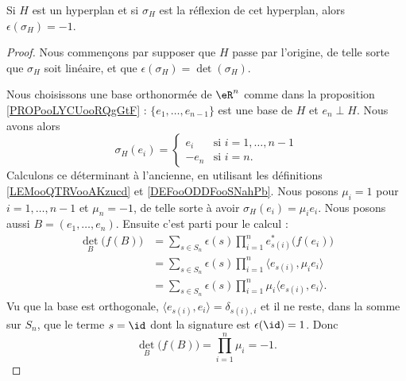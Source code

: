 \begin{lemma}    \label{LEMooJABDooOKHwWv}
	Si \( H\) est un hyperplan et si \( \sigma_{H}\) est la réflexion de cet hyperplan, alors \( \epsilon(\sigma_H)=-1\).
\end{lemma}

\begin{proof}
	Nous commençons par supposer que \( H\) passe par l'origine, de telle sorte que \( \sigma_H\) soit linéaire, et que \( \epsilon(\sigma_H)=\det(\sigma_H)\).

	Nous choisissons une base orthonormée de \( \eR^n\) comme dans la proposition \ref{PROPooLYCUooRQgGtF} : \( \{ e_1,\ldots, e_{n-1} \}\) est une base de \( H\) et \( e_n\perp H\). Nous avons alors
	\begin{equation}
		\sigma_H(e_i)=\begin{cases}
			e_i    & \text{si } i=1,\ldots, n-1 \\
			-e_{n} & \text{si } i=n.
		\end{cases}
	\end{equation}
	Calculons ce déterminant à l'ancienne, en utilisant les définitions \ref{LEMooQTRVooAKzucd} et \ref{DEFooODDFooSNahPb}. Nous posons \( \mu_i=1\) pour \( i=1,\ldots, n-1\) et \( \mu_n=-1\), de telle sorte à avoir \( \sigma_H(e_i)=\mu_ie_i\). Nous posons aussi \( B=(e_1,\ldots, e_n)\). Ensuite c'est parti pour le calcul :
	\begin{subequations}
		\begin{align}
			\det_B\big( f(B) \big) & =\sum_{s\in S_n}\epsilon(s)\prod_{i=1}^ne^*_{s(i)}\big( f(e_i) \big)       \\
			                       & =\sum_{s\in S_n}\epsilon(s)\prod_{i=1}^n\langle e_{s(i)}, \mu_ie_i\rangle  \\
			                       & =\sum_{s\in S_n}\epsilon(s)\prod_{i=1}^n\mu_i\langle e_{s(i)}, e_i\rangle.
		\end{align}
	\end{subequations}
	Vu que la base est orthogonale, \( \langle e_{s(i)}, e_i\rangle =\delta_{s(i), i}\) et il ne reste, dans la somme sur \( S_n\), que le terme \( s=\id\) dont la signature est \( \epsilon(\id)=1\). Donc
	\begin{equation}
		\det_B\big( f(B) \big)=\prod_{i=1}^n\mu_i=-1.
	\end{equation}


\end{proof}
